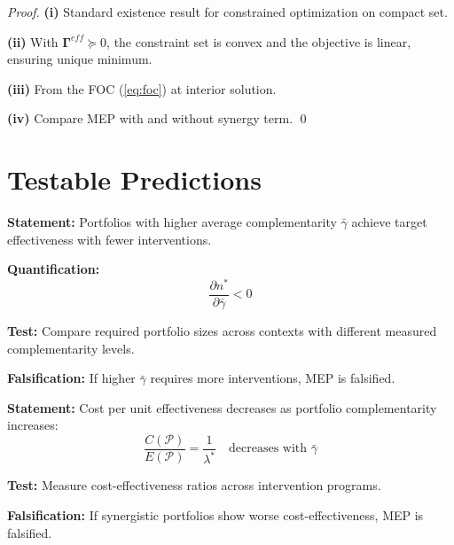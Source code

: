 \begin{proof}
\textbf{(i)} Standard existence result for constrained optimization on compact set.

\textbf{(ii)} With $\boldsymbol{\Gamma}^{eff} \succeq 0$, the constraint set is convex and
the objective is linear, ensuring unique minimum.

\textbf{(iii)} From the FOC (\ref{eq:foc}) at interior solution.

\textbf{(iv)} Compare MEP with and without synergy term. \qed
\end{proof}


\section{Testable Predictions}
\label{sec:mep-predictions}

\begin{tcolorbox}[colback=green!5!white, colframe=green!75!black,
    title=Prediction MEP-P1: Synergy Reduces Required Portfolio Size]
\textbf{Statement:} Portfolios with higher average complementarity $\bar{\gamma}$
achieve target effectiveness with fewer interventions.

\textbf{Quantification:}
\begin{equation}
\frac{\partial n^*}{\partial \bar{\gamma}} < 0
\end{equation}

\textbf{Test:} Compare required portfolio sizes across contexts with different
measured complementarity levels.

\textbf{Falsification:} If higher $\bar{\gamma}$ requires more interventions, MEP is falsified.
\end{tcolorbox}

\begin{tcolorbox}[colback=green!5!white, colframe=green!75!black,
    title=Prediction MEP-P2: Cost Efficiency Increases with Synergy]
\textbf{Statement:} Cost per unit effectiveness decreases as portfolio
complementarity increases:
\begin{equation}
\frac{C(\mathcal{P})}{E(\mathcal{P})} = \frac{1}{\lambda^*} \quad \text{decreases with } \bar{\gamma}
\end{equation}

\textbf{Test:} Measure cost-effectiveness ratios across intervention programs.

\textbf{Falsification:} If synergistic portfolios show worse cost-effectiveness,
MEP is falsified.
\end{tcolorbox}

